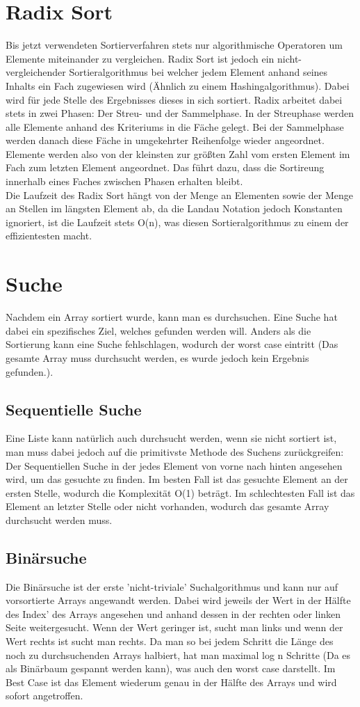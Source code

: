 \documentclass{article}
\begin{document}
	\section{Radix Sort}
	Bis jetzt verwendeten Sortierverfahren stets nur algorithmische Operatoren um Elemente miteinander zu vergleichen. Radix Sort ist jedoch ein nicht-vergleichender Sortieralgorithmus bei welcher jedem Element anhand seines Inhalts ein Fach zugewiesen wird (Ähnlich zu einem Hashingalgorithmus). Dabei wird für jede Stelle des Ergebnisses dieses in sich sortiert. Radix arbeitet dabei stets in zwei Phasen: Der Streu- und der Sammelphase. In der Streuphase werden alle Elemente anhand des Kriteriums in die Fäche gelegt. Bei der Sammelphase werden danach diese Fäche in umgekehrter Reihenfolge wieder angeordnet. Elemente werden also von der kleinsten zur größten Zahl vom ersten Element im Fach zum letzten Element angeordnet. Das führt dazu, dass die Sortireung innerhalb eines Faches zwischen Phasen erhalten bleibt. \\
	Die Laufzeit des Radix Sort hängt von der Menge an Elementen sowie der Menge an Stellen im längsten Element ab, da die Landau Notation jedoch Konstanten ignoriert, ist die Laufzeit stets O(n), was diesen Sortieralgorithmus zu einem der effizientesten macht.
	\section{Suche}
	Nachdem ein Array sortiert wurde, kann man es durchsuchen. Eine Suche hat dabei ein spezifisches Ziel, welches gefunden werden will. Anders als die Sortierung kann eine Suche fehlschlagen, wodurch der worst case eintritt (Das gesamte Array muss durchsucht werden, es wurde jedoch kein Ergebnis gefunden.).
	\subsection{Sequentielle Suche}
	Eine Liste kann natürlich auch durchsucht werden, wenn sie nicht sortiert ist, man muss dabei jedoch auf die primitivste Methode des Suchens zurückgreifen: Der Sequentiellen Suche in der jedes Element von vorne nach hinten angesehen wird, um das gesuchte zu finden. Im besten Fall ist das gesuchte Element an der ersten Stelle, wodurch die Komplexität O(1) beträgt. Im schlechtesten Fall ist das Element an letzter Stelle oder nicht vorhanden, wodurch das gesamte Array durchsucht werden muss.
	\subsection{Binärsuche}
	Die Binärsuche ist der erste 'nicht-triviale' Suchalgorithmus und kann nur auf vorsortierte Arrays angewandt werden. Dabei wird jeweils der Wert in der Hälfte des Index' des Arrays angesehen und anhand dessen in der rechten oder linken Seite weitergesucht. Wenn der Wert geringer ist, sucht man links und wenn der Wert rechts ist sucht man rechts. Da man so bei jedem Schritt die Länge des noch zu durchsuchenden Arrays halbiert, hat man maximal log n Schritte (Da es als Binärbaum gespannt werden kann), was auch den worst case darstellt. Im Best Case ist das Element wiederum genau in der Hälfte des Arrays und wird sofort angetroffen.
\end{document}
